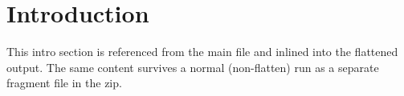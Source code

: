 \section{Introduction}
This intro section is referenced from the main file and inlined into the
flattened output. The same content survives a normal (non-flatten) run as
a separate fragment file in the zip.
